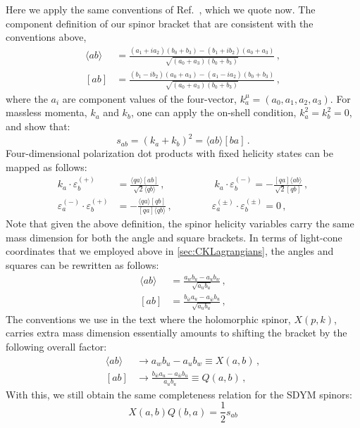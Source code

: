 \documentclass[11pt,letter]{article}
\begin{document}
Here we apply the same conventions of Ref.~\cite{jjmcTASI2014}, which we quote now. The component definition of our spinor bracket that are consistent with the conventions above,
\begin{align}
\langle ab \rangle &= \frac{(a_1 + i a_2)(b_0+b_3)-(b_1 + i b_2)(a_0+a_3)}{\sqrt{(a_0+a_3)(b_0+b_3)}}\,,
\\
[ab] &= \frac{(b_1 - i b_2)(a_0+a_3)-(a_1 - i a_2)(b_0+b_3)}{\sqrt{(a_0+a_3)(b_0+b_3)}}\,,
\end{align}
where the $a_i$ are component values of the four-vector, $k^\mu_a = (a_0,a_1,a_2,a_3)$. For massless momenta, $k_a$ and $k_b$, one can apply the on-shell condition, $k_a^2=k_b^2=0$, and show that:
\begin{equation}
s_{ab} = (k_a+k_b)^2= \langle ab \rangle[ba]\,.
\end{equation}
Four-dimensional polarization dot products with fixed helicity states can be mapped as follows:
\begin{equation}\label{eq:4DPols}
\begin{aligned}
k_a \cdot \varepsilon_b^{(+)} &= \frac{\langle q a \rangle[ab]}{\sqrt{2}\langle q b\rangle}\,,
\qquad\quad \qquad
k_a \cdot \varepsilon_b^{(-)} = -\frac{[qa]\langle ab\rangle}{\sqrt{2}[qb]}\,,
\\
\varepsilon_a^{(-)}\cdot \varepsilon_b^{(+)} &= - \frac{\langle q a\rangle [qb]}{ [qa]\langle q b\rangle} \,,
\qquad \qquad
\varepsilon_a^{(\pm)}\cdot \varepsilon_b^{(\pm)} = 0 \,,
\end{aligned}
\end{equation}
Note that given the above definition, the spinor helicity variables carry the same mass dimension for both the angle and square brackets. In terms of light-cone coordinates that we employed above in \cref{sec:CKLagrangians}, the angles and squares can be rewritten as follows:
\begin{align}
\langle ab \rangle &= \frac{a_w b_u-a_u b_w}{\sqrt{a_ub_u}}\,,
\\
[ab] &= \frac{b_{\bar{w}}a_u-a_{\bar{w}}b_u}{\sqrt{a_ub_u}}\,,
\end{align}
The conventions we use in the text where the holomorphic spinor, $X(p,k)$, carries extra mass dimension essentially amounts to shifting the bracket by the following overall factor:
\begin{align}
\langle ab \rangle &\rightarrow a_w b_u-a_u b_w \equiv X(a,b)\,,
\\
[ab] &\rightarrow \frac{b_{\bar{w}}a_u-a_{\bar{w}}b_u}{a_ub_u}\equiv Q(a,b)\,,
\end{align}
With this, we still obtain the same completeness relation for the SDYM spinors:
\begin{equation}
X(a,b)Q(b,a) = \frac{1}{2}s_{ab}
\end{equation}
\end{document}
